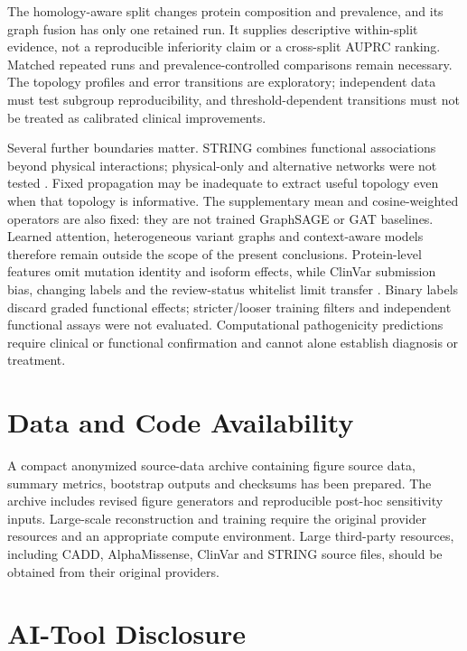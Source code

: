 \documentclass[conference]{IEEEtran}
\begin{document}
The homology-aware split changes protein composition and prevalence, and its graph fusion has only one retained run. It supplies descriptive within-split evidence, not a reproducible inferiority claim or a cross-split AUPRC ranking. Matched repeated runs and prevalence-controlled comparisons remain necessary. The topology profiles and error transitions are exploratory; independent data must test subgroup reproducibility, and threshold-dependent transitions must not be treated as calibrated clinical improvements.

Several further boundaries matter. STRING combines functional associations beyond physical interactions; physical-only and alternative networks were not tested \cite{Szklarczyk2023STRING}. Fixed propagation may be inadequate to extract useful topology even when that topology is informative. The supplementary mean and cosine-weighted operators are also fixed: they are not trained GraphSAGE or GAT baselines. Learned attention, heterogeneous variant graphs and context-aware models therefore remain outside the scope of the present conclusions. Protein-level features omit mutation identity and isoform effects, while ClinVar submission bias, changing labels and the review-status whitelist limit transfer \cite{Landrum2020ClinVar}. Binary labels discard graded functional effects; stricter/looser training filters and independent functional assays were not evaluated. Computational pathogenicity predictions require clinical or functional confirmation and cannot alone establish diagnosis or treatment.

\section*{Data and Code Availability}

A compact anonymized source-data archive containing figure source data, summary metrics, bootstrap outputs and checksums has been prepared. The archive includes revised figure generators and reproducible post-hoc sensitivity inputs. Large-scale reconstruction and training require the original provider resources and an appropriate compute environment. Large third-party resources, including CADD, AlphaMissense, ClinVar and STRING source files, should be obtained from their original providers.

\section*{AI-Tool Disclosure}
\end{document}
